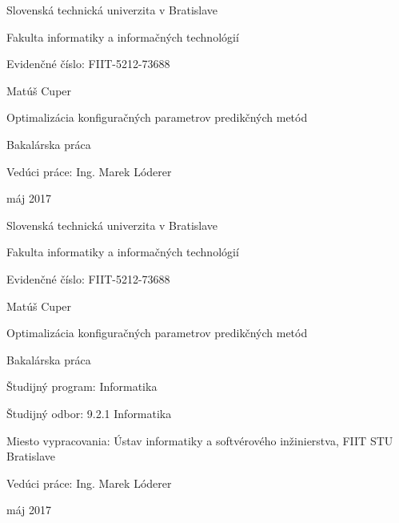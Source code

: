 \documentclass[a4paper,slovak,12pt,appendix]{article}
\begin{document}
\begin{titlepage}
	\centering
	{\Large Slovenská technická univerzita v Bratislave \par}
	{\Large Fakulta informatiky a informačných technológií \par}
  \vspace{0.5cm}
  {\normalsize Evidenčné číslo: FIIT-5212-73688 \par}
	\vspace{7cm}
  {\large Matúš Cuper \par}
  \vspace{0.5cm}
	{\LARGE Optimalizácia konfiguračných parametrov predikčných metód \par}
	\vspace{0.5cm}
	{\large Bakalárska práca \par}
	\vspace{7cm}
  \flushleft
	{\large Vedúci práce: Ing. Marek Lóderer \par}
  \vspace{0.5cm}
  {\large máj 2017 \par}
	\vfill
\end{titlepage}

\begin{titlepage}
	\centering
  {\Large Slovenská technická univerzita v Bratislave \par}
	{\Large Fakulta informatiky a informačných technológií \par}
  \vspace{0.5cm}
  {\normalsize Evidenčné číslo: FIIT-5212-73688 \par}
	\vspace{7cm}
  {\large Matúš Cuper \par}
  \vspace{0.5cm}
	{\LARGE Optimalizácia konfiguračných parametrov predikčných metód \par}
	\vspace{0.5cm}
	{\large Bakalárska práca \\}
	\vspace{7cm}
  \flushleft
  {\normalsize Študijný program: Informatika \par}
	{\normalsize Študijný odbor: 9.2.1 Informatika \par}
	{\normalsize Miesto vypracovania: Ústav informatiky a softvérového inžinierstva, FIIT STU Bratislave \par}
	{\normalsize Vedúci práce: Ing. Marek Lóderer \par}
  \vspace{0.5cm}
  {\normalsize máj 2017 \par}
\end{titlepage}
\end{document}
